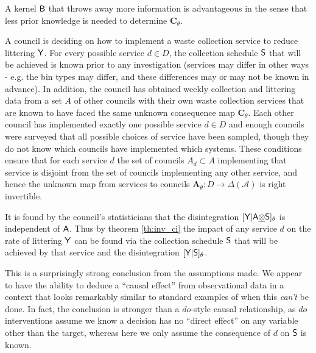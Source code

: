 A kernel $\mathsf{B}$ that throws away more information is advantageous in the sense that less prior knowledge is needed to determine $\mathbf{C}_\theta$.
\begin{example}
A council is deciding on how to implement a waste collection service to reduce littering $\mathsf{Y}$. For every possible service $d\in D$, the collection schedule $\mathsf{S}$ that will be achieved is known prior to any investigation (services may differ in other ways - e.g. the bin types may differ, and these differences may or may not be known in advance). In addition, the council has obtained weekly collection and littering data from a set $A$ of other councils with their own waste collection services that are known to have faced the same unknown consequence map $\mathbf{C}_\theta$. Each other council has implemented exactly one possible service $d\in D$ and enough councils were surveyed that all possible choices of service have been sampled, though they do not know which councils have implemented which systems. These conditions ensure that for each service $d$ the set of councils $A_d\subset A$ implementing that service is disjoint from the set of councils implementing any other service, and hence the unknown map from services to councils $\mathbf{A}_\theta:D\to \Delta(\mathcal{A})$ is right invertible.

It is found by the council's statisticians that the disintegration $[\mathsf{Y}|\mathsf{A}\underline{\otimes}\mathsf{S}]_\theta$ is independent of $\mathsf{A}$. Thus by theorem \ref{th:inv_ci} the impact of any service $d$ on the rate of littering $\mathsf{Y}$ can be found via the collection schedule $\mathsf{S}$ that will be achieved by that service and the disintegration $[\mathsf{Y}|\mathsf{S}]_\theta$.

This is a surprisingly strong conclusion from the assumptions made. We appear to have the ability to deduce a ``causal effect'' from observational data in a context that looks remarkably similar to standard examples of when this \emph{can't} be done. In fact, the conclusion is stronger than a $do$-style causal relationship, as $do$ interventions assume we know a decision has no ``direct effect'' on any variable other than the target, whereas here we only assume the consequence of $d$ on $\mathsf{S}$ is known.


\end{example}
